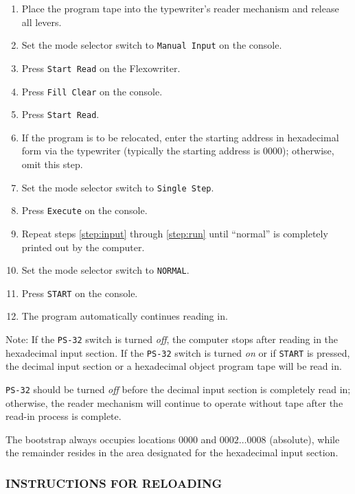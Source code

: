 \begin{enumerate}[label=\alph*)]
\item Place the program tape into the typewriter's reader mechanism and release all levers.
\item \label{step:input} Set the mode selector switch to \texttt{Manual Input} on the console.
\item Press \texttt{Start Read} on the Flexowriter.
\item Press \texttt{Fill Clear} on the console.
\item Press \texttt{Start Read}.
\item If the program is to be relocated, enter the starting address in hexadecimal form via the typewriter (typically the starting address is $0000$); otherwise, omit this step.
\item Set the mode selector switch to \texttt{Single Step}.
\item \label{step:run} Press \texttt{Execute} on the console.
\item Repeat steps \ref{step:input} through \ref{step:run} until ``normal'' is completely printed out by the computer.
\item Set the mode selector switch to \texttt{NORMAL}.
\item Press \texttt{START} on the console.
\item The program automatically continues reading in.
\end{enumerate}
Note: If the \texttt{PS-32} switch is turned \emph{off}, the computer stops after reading in the hexadecimal input section. If the \texttt{PS-32} switch is turned \emph{on} or if \texttt{START} is pressed, the decimal input section or a hexadecimal object program tape will be read in.

\texttt{PS-32} should be turned \emph{off} before the decimal input section is completely read in; otherwise, the reader mechanism will continue to operate without tape after the read-in process is complete.

The bootstrap always occupies locations $0000$ and $0002\dots0008$ (absolute), while the remainder resides in the area designated for the hexadecimal input section.

\subsubsection*{INSTRUCTIONS FOR RELOADING}

